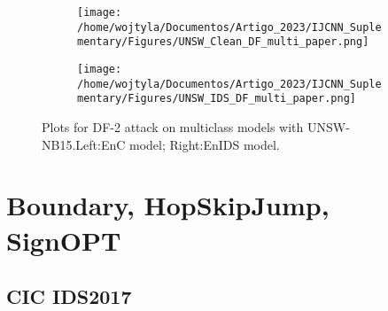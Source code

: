 \documentclass[conference]{IEEEtran}
\begin{document}
	\begin{figure}[H]
		\centering
		\begin{subfigure}[b]{0.45\textwidth}
			\texttt{[image: /home/wojtyla/Documentos/Artigo\_2023/IJCNN\_Suplementary/Figures/UNSW\_Clean\_DF\_multi\_paper.png]}
			\label{fig:1}
		\end{subfigure}
		\hfill
		\begin{subfigure}[b]{0.45\textwidth}
			\texttt{[image: /home/wojtyla/Documentos/Artigo\_2023/IJCNN\_Suplementary/Figures/UNSW\_IDS\_DF\_multi\_paper.png]}
			\label{fig:4}
		\end{subfigure}
		\caption{Plots for DF-2 attack on multiclass models with UNSW-NB15.Left:EnC model; Right:EnIDS model.}
		\label{fig:unsw_df_multi}
	\end{figure}
	
	
	\section{Boundary, HopSkipJump, SignOPT}
	
	\subsection{CIC IDS2017}
	
\end{document}
